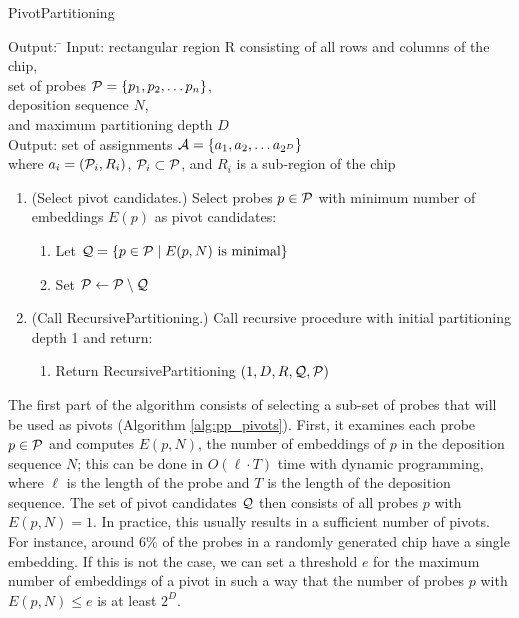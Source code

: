 \begin{algorithm}[t!]
\caption{PivotPartitioning}
\label{alg:pp_pivots}
\begin{minipage}{\textwidth}\footnotesize{
\begin{tabbing}
Output: \= \kill
Input:  \> rectangular region R consisting of all rows and columns of the chip, \\
        \> set of probes ${\mathcal{P}} = \{p_{1}, p_{2}, \dots p_{n}\}$, \\
        \> deposition sequence $N$, \\
        \> and maximum partitioning depth $D$ \\
Output: \> set of assignments ${\mathcal{A}} = \{a_1, a_2, \dots a_{2^D}\}$ \\
        \> where $a_i = ({\mathcal{P}}_i, R_i)$, ${\mathcal{P}}_i \subset {\mathcal{P}}$,
           and $R_i$ is a sub-region of the chip
\end{tabbing}
\begin{enumerate}
\item (Select pivot candidates.) Select probes $p \in {\mathcal{P}}$ with minimum number
      of embeddings $E(p)$ as pivot candidates:
  \begin{enumerate}
    \item Let ${\mathcal{Q}} = \{p \in {\mathcal{P}} \;|\; E(p,N) \mbox{ is minimal}\}$
    \item Set ${\mathcal{P}} \leftarrow {\mathcal{P}} \setminus {\mathcal{Q}}$
  \end{enumerate}
\item (Call RecursivePartitioning.) Call recursive procedure with initial
      partitioning depth 1 and return:
  \begin{enumerate}
    \item Return RecursivePartitioning $(1, D, R, {\mathcal{Q}}, {\mathcal{P}})$
  \end{enumerate}
\end{enumerate}
}\end{minipage}
\end{algorithm}

The first part of the algorithm consists of selecting a sub-set of probes that
will be used as pivots (Algorithm \ref{alg:pp_pivots}). First, it examines each
probe $p \in {\mathcal{P}}$ and computes $E(p,N)$, the number of embeddings of $p$ in
the deposition sequence $N$; this can be done in $O(\ell \cdot T)$ time with
dynamic programming, where $\ell$ is the length of the probe and $T$ is the
length of the deposition sequence. The set of pivot candidates ${\mathcal{Q}}$ then
consists of all probes $p$ with $E(p,N)=1$. In practice, this usually results in
a sufficient number of pivots. For instance, around $6\%$ of the probes in a
randomly generated chip have a single embedding. If this is not the case, we can
set a threshold $e$ for the maximum number of embeddings of a pivot in such a
way that the number of probes $p$ with $E(p,N)\leq e$ is at least $2^D$.

